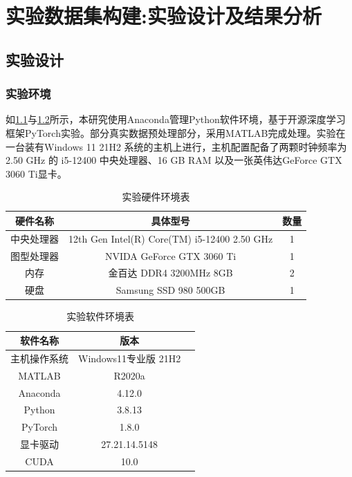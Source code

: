 \chapter{实验数据集构建:实验设计及结果分析}
\section{实验设计}
\subsection{实验环境}
如\cref{tab:3.1.1}与\cref{tab:3.1.2}所示，本研究使用Anaconda管理Python软件环境，基于开源深度学习框架PyTorch实验。部分真实数据预处理部分，采用MATLAB完成处理。实验在一台装有Windows 11 21H2 系统的主机上进行，主机配置配备了两颗时钟频率为 2.50 GHz 的 i5-12400 中央处理器、16 GB RAM 以及一张英伟达GeForce GTX 3060 Ti显卡。

\begin{table}[htb]
    \caption{实验硬件环境表}
    \centering
    \begin{tabular}{ccc}
        \toprule
        硬件名称  & 具体型号                                           & 数量 \\
        \midrule
        中央处理器 & 12th Gen Intel(R) Core(TM) i5-12400   2.50 GHz & 1  \\
        图型处理器 & NVIDA GeForce GTX 3060 Ti                      & 1  \\
        内存    & 金百达 DDR4 3200MHz 8GB                           & 2  \\
        硬盘    & Samsung SSD 980 500GB                          & 1  \\
        \bottomrule
    \end{tabular}
    \label{tab:3.1.1}
\end{table}
\begin{table}[htb]
    \caption{实验软件环境表}
    \centering
    \begin{tabular}{ccc}
        \toprule
        软件名称     & 版本                \\
        \midrule
        主机操作系统   & Windows11专业版 21H2 \\
        MATLAB   & R2020a            \\
        Anaconda & 4.12.0            \\
        Python   & 3.8.13            \\
        PyTorch  & 1.8.0             \\
        显卡驱动     & 27.21.14.5148     \\
        CUDA     & 10.0              \\
        \bottomrule
    \end{tabular}
    \label{tab:3.1.2}
\end{table}


